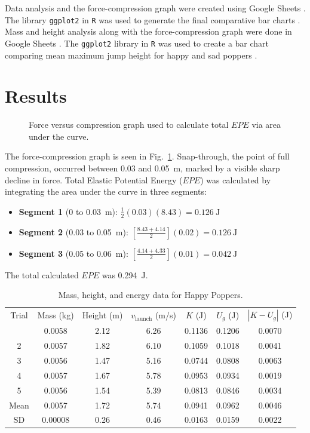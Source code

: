 \documentclass[amsmath,amssymb,aps,endfloats,linenumbers]{revtex4-2}
\begin{document}
Data analysis and the force-compression graph were created using Google Sheets \cite{googlesheets}. The library \texttt{ggplot2} in \texttt{R} was used to generate the final comparative bar charts \cite{R, ggplot2}.
Mass and height analysis along with the force-compression graph were done in Google Sheets \cite{googlesheets}. The \texttt{ggplot2} library in \texttt{R} was used to create a bar chart comparing mean maximum jump height for happy and sad poppers \cite{R, ggplot2}.

\section{Results}
\begin{figure}[htbp]
    \centering
     
    \caption{Force versus compression graph used to calculate total $EPE$ via area under the curve.}
    \label{fig:force_graph}
\end{figure}
The force-compression graph is seen in Fig.~\ref{fig:force_graph}. Snap-through, the point of full compression, occurred between \num{0.03} and \qty{0.05}{\meter}, marked by a visible sharp decline in force. Total Elastic Potential Energy ($EPE$) was calculated by integrating the area under the curve in three segments:
\begin{itemize}
    \item \textbf{Segment 1} (\num{0} to \qty{0.03}{\meter}): $\frac{1}{2}(\num{0.03})(\num{8.43}) = \qty{0.126}{\joule}$
    \item \textbf{Segment 2} (\num{0.03} to \qty{0.05}{\meter}): $[\frac{\num{8.43} + \num{4.14}}{2}](\num{0.02}) = \qty{0.126}{\joule}$
    \item \textbf{Segment 3} (\num{0.05} to \qty{0.06}{\meter}): $[\frac{\num{4.14} + \num{4.33}}{2}](\num{0.01}) = \qty{0.042}{\joule}$
\end{itemize}
The total calculated $EPE$ was \qty{0.294}{\joule}. 

\begin{table}[ht]
\caption{Mass, height, and energy data for Happy Poppers.}
\label{tab:happy}
\begin{ruledtabular}
\begin{tabular}{ccccccc}
Trial & Mass (kg) & Height (m) & $v_{\text{launch}}$ (m/s) & $K$ (J) & $U_g$ (J) & $|K-U_g|$ (J) \\
\colrule
1 & 0.0058 & 2.12 & 6.26 & 0.1136 & 0.1206 & 0.0070 \\
2 & 0.0057 & 1.82 & 6.10 & 0.1059 & 0.1018 & 0.0041 \\
3 & 0.0056 & 1.47 & 5.16 & 0.0744 & 0.0808 & 0.0063 \\
4 & 0.0057 & 1.67 & 5.78 & 0.0953 & 0.0934 & 0.0019 \\
5 & 0.0056 & 1.54 & 5.39 & 0.0813 & 0.0846 & 0.0034 \\
\colrule
Mean & 0.0057 & 1.72 & 5.74 & 0.0941 & 0.0962 & 0.0046 \\
SD & 0.00008 & 0.26 & 0.46 & 0.0163 & 0.0159 & 0.0022 \\
\end{tabular}
\end{ruledtabular}
\end{table}
\end{document}
